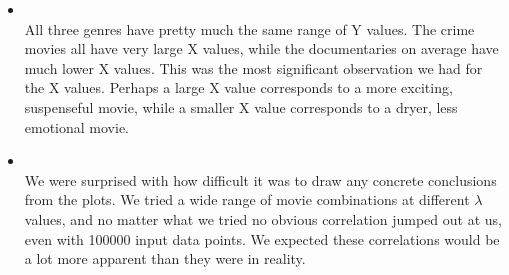 \begin{itemize}
    \item {} \\

    All three genres have pretty much the same range of Y values. The crime movies
    all have very large X values, while the documentaries on average have
    much lower X values. This was the most significant observation we had for the
    X values. Perhaps a large X value corresponds to a more exciting, suspenseful
    movie, while a smaller X value corresponds to a dryer, less emotional movie.

    \item {} \\
     We were surprised with how difficult it was to draw any concrete conclusions
    from the plots. We tried a wide range of movie combinations at different $\lambda$
    values, and no matter what we tried no obvious correlation jumped out at us,
    even with 100000 input data points. We expected these correlations would be
    a lot more apparent than they were in reality. 

\end{itemize}


\pagebreak
